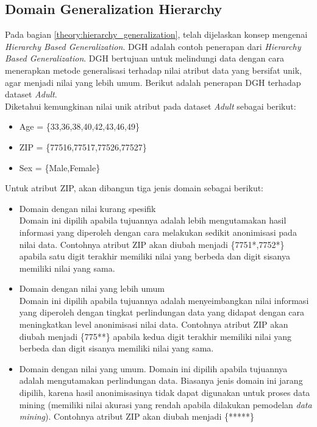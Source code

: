 \subsection{Domain Generalization Hierarchy}
Pada bagian \ref{theory:hierarchy_generalization}, telah dijelaskan konsep mengenai \textit{Hierarchy Based Generalization}. DGH adalah contoh penerapan dari \textit{Hierarchy Based Generalization}. DGH bertujuan untuk melindungi data dengan cara menerapkan metode generalisasi terhadap nilai atribut data yang bersifat unik, agar menjadi nilai yang lebih umum. Berikut adalah penerapan DGH terhadap dataset \textit{Adult}. \\

\noindent Diketahui kemungkinan nilai unik atribut pada dataset \textit{Adult} sebagai berikut:

\begin{itemize}
\item Age = \{33,36,38,40,42,43,46,49\}
\item ZIP = \{77516,77517,77526,77527\}
\item Sex = \{Male,Female\}
\end{itemize}

\noindent Untuk atribut ZIP, akan dibangun tiga jenis domain sebagai berikut:

\begin{itemize}
\item Domain dengan nilai kurang spesifik\\
Domain ini dipilih apabila tujuannya adalah lebih mengutamakan hasil informasi yang diperoleh dengan cara melakukan sedikit anonimisasi pada nilai data. Contohnya atribut ZIP akan diubah menjadi \{7751*,7752*\} apabila satu digit terakhir memiliki nilai yang berbeda dan digit sisanya memiliki nilai yang sama.
\item Domain dengan nilai yang lebih umum\\
Domain ini dipilih apabila tujuannya adalah menyeimbangkan nilai informasi yang diperoleh dengan tingkat perlindungan data yang didapat dengan cara meningkatkan level anonimisasi nilai data. Contohnya atribut ZIP akan diubah menjadi \{775**\} apabila kedua digit terakhir memiliki nilai yang berbeda dan digit sisanya memiliki nilai yang sama.
\item Domain dengan nilai yang umum.
Domain ini dipilih apabila tujuannya adalah mengutamakan perlindungan data. Biasanya jenis domain ini jarang dipilih, karena hasil anonimisasinya tidak dapat digunakan untuk proses data mining (memiliki nilai akurasi yang rendah apabila dilakukan pemodelan \textit{data mining}). Contohnya atribut ZIP akan diubah menjadi \{*****\}

\end{itemize}

